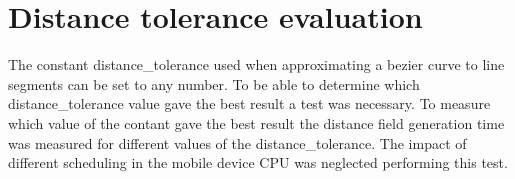 \section{Distance tolerance evaluation}\label{disttoleval}
The constant distance\_tolerance used when approximating a bezier curve to line segments can be set to any number. To be able to determine which distance\_tolerance value gave the best result a test was necessary. To measure which value of the contant gave the best result the distance field generation time was measured for different values of the distance\_tolerance. The impact of different scheduling in the mobile device CPU was neglected performing this test.
